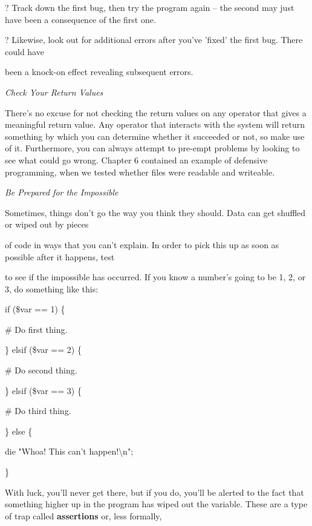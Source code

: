 \documentclass[a4paper,11pt]{book}
\begin{document}
\noindent 

\noindent ? Track down the first bug, then try the program again -- the second may just have been a consequence of the first one.

\noindent 

\noindent 

\noindent ? Likewise, look out for additional errors after you've 'fixed' the first bug. There could have

\noindent been a knock-on effect revealing subsequent errors.

\noindent 

\noindent \textit{Check Your Return Values}

\noindent There's no excuse for not checking the return values on any operator that gives a meaningful return value. Any operator that interacts with the system will return something by which you can determine whether it succeeded or not, so make use of it. Furthermore, you can always attempt to pre-empt problems by looking to see what could go wrong. Chapter 6 contained an example of defensive programming, when we tested whether files were readable and writeable.

\noindent 

\noindent \textit{Be Prepared for the Impossible}

\noindent Sometimes, things don't go the way you think they should. Data can get shuffled or wiped out by pieces

\noindent of code in ways that you can't explain. In order to pick this up as soon as possible after it happens, test

\noindent to see if the impossible has occurred. If you know a number's going to be 1, 2, or 3, do something like this:

\noindent 

\noindent if (\$var == 1) \{

\noindent \# Do first thing.

\noindent \} elsif (\$var == 2) \{

\noindent \# Do second thing.

\noindent \} elsif (\$var == 3) \{

\noindent \# Do third thing.

\noindent \} else \{

\noindent die "Whoa! This can't happen!\textbackslash n";

\noindent \}

\noindent 

\noindent With luck, you'll never get there, but if you do, you'll be alerted to the fact that something higher up in the program has wiped out the variable. These are a type of trap called \textbf{assertions }or, less formally,
\end{document}

